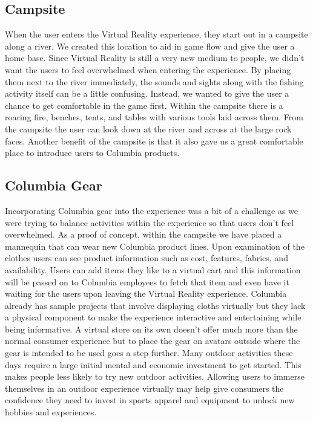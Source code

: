 \documentclass[10pt,journal,compsoc,onecolumn, draftclsnofoot]{IEEEtran}
\begin{document}
\subsection{Campsite}
When the user enters the Virtual Reality experience, they start out in a campsite along a river. We created this location to aid in game flow and give the user a home base. Since Virtual Reality is still a very new medium to people, we didn’t want the users to feel overwhelmed when entering the experience. By placing them next to the river immediately, the sounds and sights along with the fishing activity itself can be a little confusing. Instead, we wanted to give the user a chance to get comfortable in the game first. Within the campsite there is a roaring fire, benches, tents, and tables with various tools laid across them. From the campsite the user can look down at the river and across at the large rock faces. Another benefit of the campsite is that it also gave us a great comfortable place to introduce users to Columbia products.

\subsection{Columbia Gear}
Incorporating Columbia gear into the experience was a bit of a challenge as we were trying to balance activities within the experience so that users don’t feel overwhelmed. As a proof of concept, within the campsite we have placed a mannequin that can wear new Columbia product lines. Upon examination of the clothes users can see product information such as cost, features, fabrics, and availability. Users can add items they like to a virtual cart and this information will be passed on to Columbia employees to fetch that item and even have it waiting for the users upon leaving the Virtual Reality experience. Columbia already has sample projects that involve displaying cloths virtually but they lack a physical component to make the experience interactive and entertaining while being informative. A virtual store on its own doesn’t offer much more than the normal consumer experience but to place the gear on avatars outside where the gear is intended to be used goes a step further. Many outdoor activities these days require a large initial mental and economic investment to get started. This makes people less likely to try new outdoor activities. Allowing users to immerse themselves in an outdoor experience virtually may help give consumers the confidence they need to invest in sports apparel and equipment to unlock new hobbies and experiences.
\end{document}
